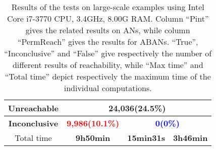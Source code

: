 \documentclass{article}
\theoremstyle{definition}
\begin{document}
\begin{table}[ht]
\begin{tabular}{|c|c|c|c|}
     \hline
     Unreachable&\multicolumn{3}{c|}{24,036(24.5\%)}\\
     \hline
     \textbf{Inconclusive} &\textcolor{red}{\textbf{9,986(10.1\%)}}&\multicolumn{2}{c|}{\textcolor{blue}{\textbf{0(0\%)}}}   \\
     \hline
     Total time & \textbf{9h50min}      & \textbf{15min31s}         & \textbf{3h46min} \\
     \hline
    \end{tabular}
\caption{Results of the tests on large-scale examples using Intel Core i7-3770 CPU, \@3.4GHz, 8.00G RAM. 
Column ``Pint'' gives the related results on ANs, while column ``PermReach'' gives the results for ABANs. 
``True'', ``Inconclusive'' and ``False'' give respectively the number of different results of reachability, while ``Max time'' and ``Total time'' depict respectively the maximum time of the individual computations.}
\label{tab:2}
\end{table}
\end{document}
